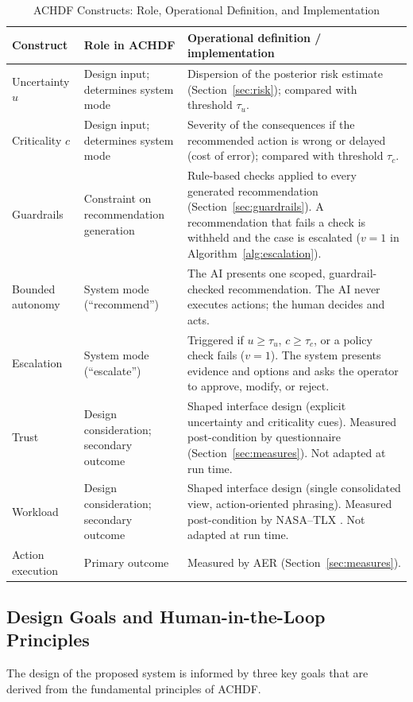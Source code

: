 \documentclass[journal]{IEEEtran}
\theoremstyle{plain}
\theoremstyle{definition}
\begin{document}
\begin{table}[t]
\centering
\caption{ACHDF Constructs: Role, Operational Definition, and Implementation}
\label{tab:constructs}
\begin{tabular}{p{2.4cm} p{3.4cm} p{10.6cm}}
\toprule
\textbf{Construct} & \textbf{Role in ACHDF} & \textbf{Operational definition / implementation} \\
\midrule
Uncertainty $u$ & Design input; determines system mode & Dispersion of the posterior risk estimate (Section~\ref{sec:risk}); compared with threshold $\tau_u$. \\
Criticality $c$ & Design input; determines system mode & Severity of the consequences if the recommended action is wrong or delayed (cost of error); compared with threshold $\tau_c$. \\
Guardrails & Constraint on recommendation generation & Rule-based checks applied to every generated recommendation (Section~\ref{sec:guardrails}). A recommendation that fails a check is withheld and the case is escalated ($v=1$ in Algorithm~\ref{alg:escalation}). \\
Bounded autonomy & System mode (``recommend'') & The AI presents one scoped, guardrail-checked recommendation. The AI never executes actions; the human decides and acts. \\
Escalation & System mode (``escalate'') & Triggered if $u \ge \tau_u$, $c \ge \tau_c$, or a policy check fails ($v=1$). The system presents evidence and options and asks the operator to approve, modify, or reject. \\
Trust & Design consideration; secondary outcome & Shaped interface design (explicit uncertainty and criticality cues). Measured post-condition by questionnaire (Section~\ref{sec:measures}). Not adapted at run time. \\
Workload & Design consideration; secondary outcome & Shaped interface design (single consolidated view, action-oriented phrasing). Measured post-condition by NASA--TLX \cite{Hart1988}. Not adapted at run time. \\
Action execution & Primary outcome & Measured by AER (Section~\ref{sec:measures}). \\
\bottomrule
\end{tabular}
\end{table}

    \subsection{Design Goals and Human-in-the-Loop Principles}
    The design of the proposed system is informed by three key goals that are derived from the fundamental principles of ACHDF.
\end{document}
